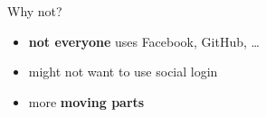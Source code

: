 \documentclass[ignorenonframetext,aspectratio=169]{beamer}
\providecommand{\tightlist}{%
  \setlength{\itemsep}{0pt}\setlength{\parskip}{0pt}}
\begin{document}
\begin{frame}[plain]
\centering
{}
\end{frame}

\begin{frame}[plain]
\centering
{}
\end{frame}

\begin{frame}{Why not?}
\begin{itemize}
\tightlist
\item {\bf not everyone} uses Facebook, GitHub, \ldots
\item might not want to use social login
\item more {\bf moving parts}
\end{itemize}
\end{frame}
\end{document}
